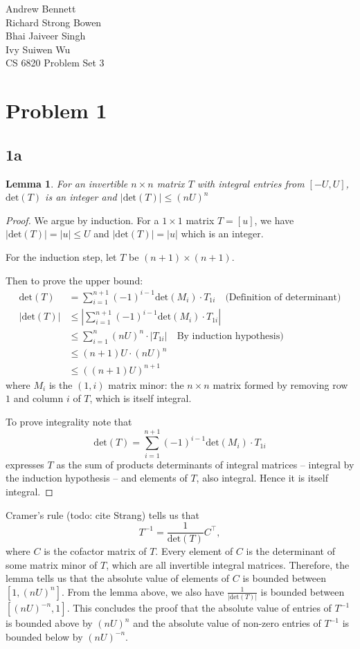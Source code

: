 \documentclass{article}
\newtheorem{lemma}{Lemma}
\begin{document}
\begin{flushright}
Andrew Bennett\\
Richard Strong Bowen\\
Bhai Jaiveer Singh\\
Ivy Suiwen Wu\\
CS 6820 Problem Set 3
\end{flushright}
\section*{Problem 1}
\subsection*{1a}
\begin{lemma}
For an invertible $n\times n$ matrix $T$ with integral entries from $[-U, U]$,
$\text{det}(T)$ is an integer and $|\text{det}(T)| \leq (nU)^n$
\end{lemma}
\begin{proof}
We argue by induction. For a $1\times 1$ matrix $T = [u]$, we have
$|\text{det}(T)|= |u|\leq U$ and $|\text{det}(T)| = |u|$ which is an integer.
       
For the induction step, let $T$ be $(n+1)\times (n+1)$.
       
Then to prove the upper bound:
\begin{align*}
	\text{det}(T) &= \sum_{i=1}^{n+1} (-1)^{i-1}\text{det}(M_i)\cdot T_{1i} \quad \text{(Definition of determinant)}\\
	\left |\text{det}(T)\right |&\leq \left |\sum_{i=1}^{n+1} (-1)^{i-1}\text{det}(M_i)\cdot T_{1i}\right|\\
	&\leq \sum_{i=1}^{n}(nU)^{n}\cdot |T_{1i}|\quad \text{By induction hypothesis)}\\
&\leq(n+1)U\cdot (nU)^{n}\\
&\leq ((n+1)U)^{n+1}
\end{align*}
where $M_i$ is the $(1,i)$ matrix minor: the $n\times n$ matrix formed by removing row $1$ and column $i$ of $T$, which is itself integral.

To prove integrality note that
\[\text{det}(T) = \sum_{i=1}^{n+1} (-1)^{i-1}\text{det}(M_i)\cdot T_{1i}\]
expresses $T$ as the sum of products determinants of integral matrices --
integral by the induction hypothesis -- and elements of $T$, also
integral. Hence it is itself integral.

\end{proof}

Cramer's rule (todo: cite Strang) tells us that 
\[T^{-1} = \frac{1}{\text{det}(T)}C^{\intercal},\]
where $C$ is the cofactor matrix of $T$. Every element of $C$ is the
determinant of some matrix minor of $T$, which are all invertible integral
matrices. Therefore, the lemma tells us that the absolute value of elements of $C$ is bounded
between $[1, (nU)^{n}]$. From the lemma above, we also have
$\frac{1}{|\text{det}(T)|}$ is bounded between $[(nU)^{-n},1]$. This concludes
the proof that the absolute value of entries of $T^{-1}$ is bounded above by
$(nU)^{n}$ and the absolute value of non-zero entries of $T^{-1}$ is bounded
below by $(nU)^{-n}$.
\end{document}
